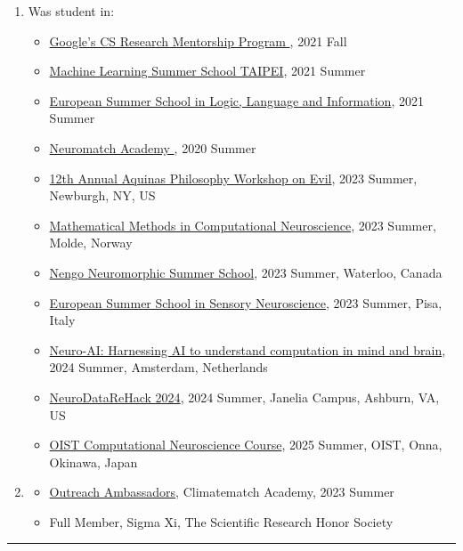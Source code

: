 \documentclass[10pt,letterpaper]{article}
\begin{document}
\begin{enumerate}
\item Was student in:
\begin{itemize}
     \item  \href{https://research.google/outreach/csrmp/}{Google’s CS Research Mentorship Program      }, 2021 Fall
     \item  \href{https://ai.ntu.edu.tw/mlss2021new/}{Machine Learning Summer School TAIPEI}, 2021 Summer
    \item \href{https://yunlongxucom.files.wordpress.com/2021/09/esslli21.pdf}{European Summer School in Logic, Language and Information}, 2021 Summer
    \item \href{https://neuromatch.io/}{Neuromatch Academy  }, 2020 Summer
    \item \href{https://thomisticinstitute.org/events/aquinas-on-evil-12th-annual-aquinas-philosophy-workshop}{12th Annual Aquinas Philosophy Workshop on Evil}, 2023 Summer, Newburgh, NY, US
    
    \item \href{https://www.compneuronrsn.org/}{Mathematical Methods in Computational Neuroscience}, 2023 Summer, Molde, Norway
    \item \href{https://www.nengo.ai/summer-school/}{Nengo Neuromorphic Summer School}, 2023 Summer, Waterloo, Canada
    \item \href{https://musicinthebrain.au.dk/display/artikel/european-summer-school-in-sensory-neuroscience}{European Summer School in Sensory Neuroscience}, 2023 Summer, Pisa, Italy
    \item \href{https://ivi.fnwi.uva.nl/ellis/news-/neuro-ai-harnessing-ai-to-understand-computation-in-mind-and-brain/}{Neuro-AI: Harnessing AI to understand computation in mind and brain}, 2024 Summer, Amsterdam, Netherlands
    \item \href{https://neurodatawithoutborders.github.io/nwb_hackathons/HCK21_2024_Janelia_NDRH/}{NeuroDataReHack 2024}, 2024 Summer, Janelia Campus, Ashburn, VA, US
    \item \href{https://groups.oist.jp/ocnc/program-2025}{OIST Computational Neuroscience Course}, 2025 Summer, OIST, Onna, Okinawa, Japan
\end{itemize}

\item 
\begin{itemize}
     \item  \href{https://academy.climatematch.io/about}{Outreach Ambassadors}, Climatematch Academy, 2023 Summer
     \item  Full Member, Sigma Xi, The Scientific Research Honor Society
\end{itemize}

\end{enumerate}

\hrule
\end{document}
